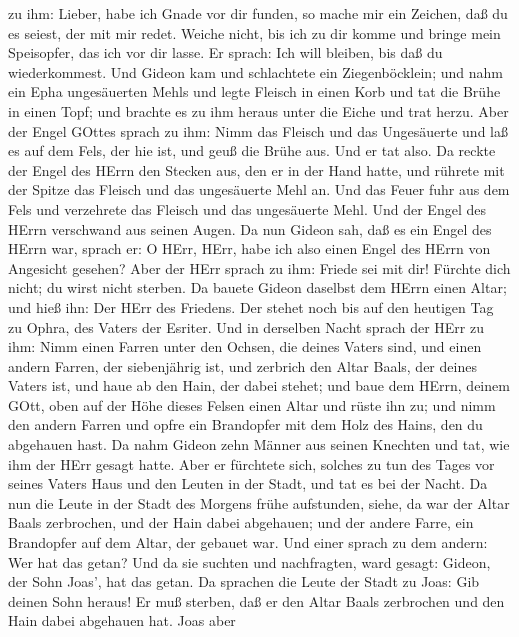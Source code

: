 zu ihm: Lieber, habe ich Gnade vor dir funden, so mache mir ein Zeichen,
daß du es seiest, der mit mir redet.  Weiche nicht, bis ich
zu dir komme und bringe mein Speisopfer, das ich vor dir lasse. Er
sprach: Ich will bleiben, bis daß du wiederkommest.  Und
Gideon kam und schlachtete ein Ziegenböcklein; und nahm ein Epha
ungesäuerten Mehls und legte Fleisch in einen Korb und tat die Brühe in
einen Topf; und brachte es zu ihm heraus unter die Eiche und trat herzu.
 Aber der Engel GOttes sprach zu ihm: Nimm das Fleisch und
das Ungesäuerte und laß es auf dem Fels, der hie ist, und geuß die Brühe
aus. Und er tat also.  Da reckte der Engel des HErrn den
Stecken aus, den er in der Hand hatte, und rührete mit der Spitze das
Fleisch und das ungesäuerte Mehl an. Und das Feuer fuhr aus dem Fels und
verzehrete das Fleisch und das ungesäuerte Mehl. Und der Engel des HErrn
verschwand aus seinen Augen.  Da nun Gideon sah, daß es ein
Engel des HErrn war, sprach er: O HErr, HErr, habe ich also einen Engel
des HErrn von Angesicht gesehen?  Aber der HErr sprach zu
ihm: Friede sei mit dir! Fürchte dich nicht; du wirst nicht sterben.
 Da bauete Gideon daselbst dem HErrn einen Altar; und hieß
ihn: Der HErr des Friedens. Der stehet noch bis auf den heutigen Tag zu
Ophra, des Vaters der Esriter.  Und in derselben Nacht
sprach der HErr zu ihm: Nimm einen Farren unter den Ochsen, die deines
Vaters sind, und einen andern Farren, der siebenjährig ist, und zerbrich
den Altar Baals, der deines Vaters ist, und haue ab den Hain, der dabei
stehet;  und baue dem HErrn, deinem GOtt, oben auf der Höhe
dieses Felsen einen Altar und rüste ihn zu; und nimm den andern Farren
und opfre ein Brandopfer mit dem Holz des Hains, den du abgehauen hast.
 Da nahm Gideon zehn Männer aus seinen Knechten und tat,
wie ihm der HErr gesagt hatte. Aber er fürchtete sich, solches zu tun
des Tages vor seines Vaters Haus und den Leuten in der Stadt, und tat es
bei der Nacht.  Da nun die Leute in der Stadt des Morgens
frühe aufstunden, siehe, da war der Altar Baals zerbrochen, und der Hain
dabei abgehauen; und der andere Farre, ein Brandopfer auf dem Altar, der
gebauet war.  Und einer sprach zu dem andern: Wer hat das
getan? Und da sie suchten und nachfragten, ward gesagt: Gideon, der Sohn
Joas', hat das getan.  Da sprachen die Leute der Stadt zu
Joas: Gib deinen Sohn heraus! Er muß sterben, daß er den Altar Baals
zerbrochen und den Hain dabei abgehauen hat.  Joas aber
